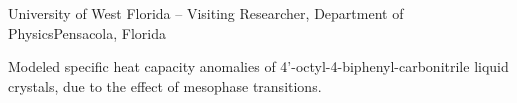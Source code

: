 \begin{rSubsection}{University of West Florida}{ -- }{Visiting Researcher, Department of Physics}{Pensacola, Florida}
\item Modeled specific heat capacity anomalies of 4'-octyl-4-biphenyl-carbonitrile liquid crystals, due to the effect of mesophase transitions.
  \else \fi
\end{rSubsection}